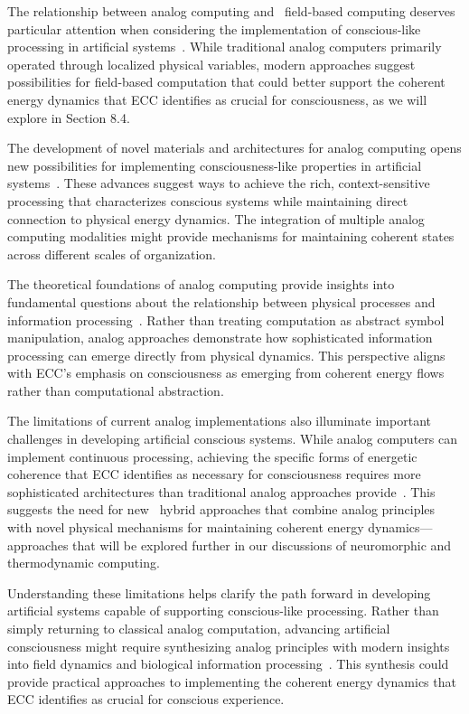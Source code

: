The relationship between analog computing and~ field-based computing deserves particular attention when considering the implementation of conscious-like processing in artificial systems~\cite{MacLennan2009}. While traditional analog computers primarily operated through localized physical variables, modern approaches suggest possibilities for field-based computation that could better support the coherent energy dynamics that ECC identifies as crucial for consciousness, as we will explore in Section 8.4.

The development of novel materials and architectures for analog computing opens new possibilities for implementing consciousness-like properties in artificial systems~\cite{Thompson2009, Boahen2021}. These advances suggest ways to achieve the rich, context-sensitive processing that characterizes conscious systems while maintaining direct connection to physical energy dynamics. The integration of multiple analog computing modalities might provide mechanisms for maintaining coherent states across different scales of organization.

The theoretical foundations of analog computing provide insights into fundamental questions about the relationship between physical processes and information processing~\cite{Zauner2020, Magnasco1997}. Rather than treating computation as abstract symbol manipulation, analog approaches demonstrate how sophisticated information processing can emerge directly from physical dynamics. This perspective aligns with ECC's emphasis on consciousness as emerging from coherent energy flows rather than computational abstraction.

The limitations of current analog implementations also illuminate important challenges in developing artificial conscious systems. While analog computers can implement continuous processing, achieving the specific forms of energetic coherence that ECC identifies as necessary for consciousness requires more sophisticated architectures than traditional analog approaches provide~\cite{Adamatzky2020a, Wang2021}. This suggests the need for new~ hybrid approaches that combine analog principles with novel physical mechanisms for maintaining coherent energy dynamics—approaches that will be explored further in our discussions of neuromorphic and thermodynamic computing.

Understanding these limitations helps clarify the path forward in developing artificial systems capable of supporting conscious-like processing. Rather than simply returning to classical analog computation, advancing artificial consciousness might require synthesizing analog principles with modern insights into field dynamics and biological information processing~\cite{Mayne2019, Indiveri2020}. This synthesis could provide practical approaches to implementing the coherent energy dynamics that ECC identifies as crucial for conscious experience.

